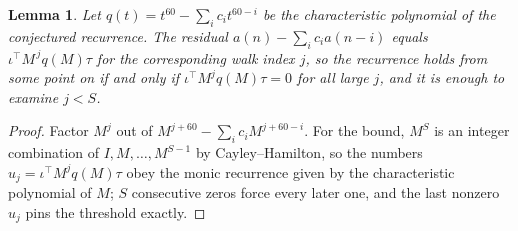 \documentclass[11pt,a4paper]{article}
\theoremstyle{plain}
\newtheorem{lemma}[theorem]{Lemma}
\theoremstyle{definition}
\begin{document}
\begin{lemma}\label{lem:crit}
Let $q(t)=t^{60}-\sum_i c_it^{60-i}$ be the characteristic polynomial of the
conjectured recurrence. The residual $a(n)-\sum_ic_ia(n-i)$ equals
$\iota^{\!\top}M^{\,j}q(M)\tau$ for the corresponding walk index $j$, so the recurrence
holds from some point on if and only if $\iota^{\!\top}M^{j}q(M)\tau=0$ for all large $j$,
and it is enough to examine $j<S$.
\end{lemma}

\begin{proof}
Factor $M^{j}$ out of $M^{j+60}-\sum_ic_iM^{j+60-i}$. For the bound, $M^{S}$
is an integer combination of $I,M,\dots,M^{S-1}$ by Cayley--Hamilton, so the numbers
$u_j=\iota^{\!\top}M^{j}q(M)\tau$ obey the monic recurrence given by the characteristic
polynomial of $M$; $S$ consecutive zeros force every later one, and the last nonzero $u_j$
pins the threshold exactly.
\end{proof}
\end{document}
